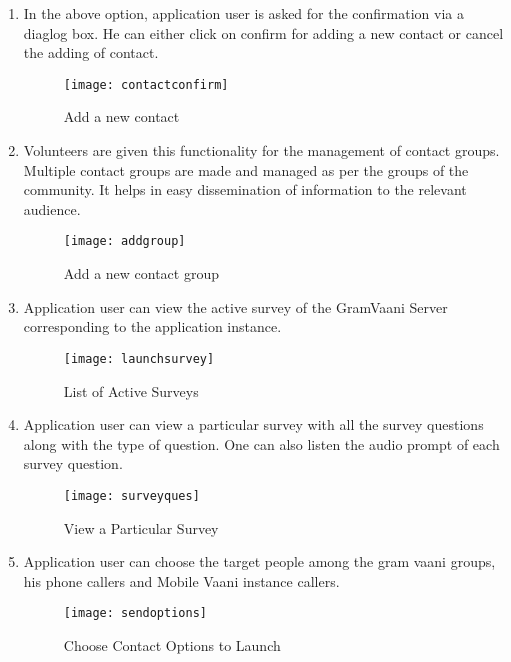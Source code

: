 \begin {enumerate}
\item In the above option, application user is asked for the confirmation via a diaglog box. He can either click on confirm for adding a new contact or cancel the adding of contact.
\begin{figure}[H]
\begin{center}   
\texttt{[image: contactconfirm]}
\caption{Add a new contact}
\label{fig:contact2}
\end{center}
\end{figure}
 
\item  Volunteers are given this functionality for the management of contact groups. Multiple contact groups are made and managed as per the groups of the community. It helps in easy dissemination of information to the relevant audience.
\begin{figure}[H]
\begin{center}   
\texttt{[image: addgroup]}
\caption{Add a new contact group}
\label{fig:group1}
\end{center}
\end{figure}

\item Application user can view the active survey of the GramVaani Server corresponding to the application instance.
\begin{figure}[H]
\begin{center}   
\texttt{[image: launchsurvey]}
\caption{List of Active Surveys}
\label{fig:viewlaunchsurvey}
\end{center}
\end{figure}

\item Application user can view a particular survey with all the survey questions along with the type of question. One can also listen the audio prompt of each survey question.
\begin{figure}[H]
\begin{center}   
\texttt{[image: surveyques]}
\caption{View a Particular Survey}
\label{fig:viewsurvey}
\end{center}
\end{figure}

\item  Application user can choose the target people among the gram vaani groups, his phone callers and  Mobile Vaani instance callers.
\begin{figure}[H]
\begin{center}   
\texttt{[image: sendoptions]}
\caption{Choose Contact Options to Launch}
\label{fig:contactoptions}
\end{center}
\end{figure}


\end{enumerate}
